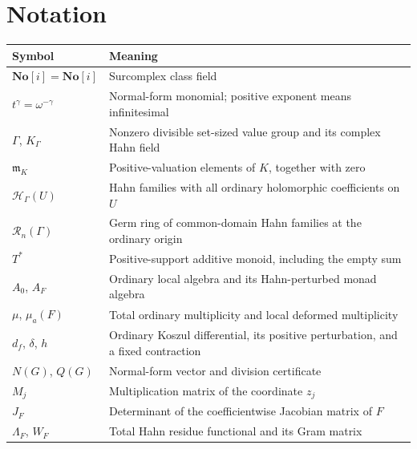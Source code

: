 \documentclass[11pt]{article}
\theoremstyle{definition}
\newcommand{\No}{\mathbf{No}}
\newcommand{\SC}{\mathbf{No}[i]}
\newcommand{\HH}{\mathcal H}
\newcommand{\RR}{\mathscr R}
\newcommand{\mm}{\mathfrak m}
\begin{document}
\section{Notation}
\begin{center}\small
\begin{longtable}{@{}L{0.26\textwidth}L{0.65\textwidth}@{}}
\toprule
Symbol & Meaning\\
\midrule
\endhead
$\SC=\No[i]$ & Surcomplex class field\\[0.3em]
$t^\gamma=\omega^{-\gamma}$ & Normal-form monomial; positive exponent means infinitesimal\\[0.3em]
$\Gamma$, $K_\Gamma$ & Nonzero divisible set-sized value group and its complex Hahn field\\[0.3em]
$\mm_K$ & Positive-valuation elements of $K$, together with zero\\[0.3em]
$\HH_\Gamma(U)$ & Hahn families with all ordinary holomorphic coefficients on $U$\\[0.3em]
$\RR_n(\Gamma)$ & Germ ring of common-domain Hahn families at the ordinary origin\\[0.3em]
$T^*$ & Positive-support additive monoid, including the empty sum\\[0.3em]
$A_0$, $A_F$ & Ordinary local algebra and its Hahn-perturbed monad algebra\\[0.3em]
$\mu$, $\mu_a(F)$ & Total ordinary multiplicity and local deformed multiplicity\\[0.3em]
$d_f$, $\delta$, $h$ & Ordinary Koszul differential, its positive perturbation, and a fixed contraction\\[0.3em]
$N(G)$, $Q(G)$ & Normal-form vector and division certificate\\[0.3em]
$M_j$ & Multiplication matrix of the coordinate $z_j$\\[0.3em]
$J_F$ & Determinant of the coefficientwise Jacobian matrix of $F$\\[0.3em]
$\Lambda_F$, $W_F$ & Total Hahn residue functional and its Gram matrix\\
\bottomrule
\end{longtable}
\end{center}
\end{document}
